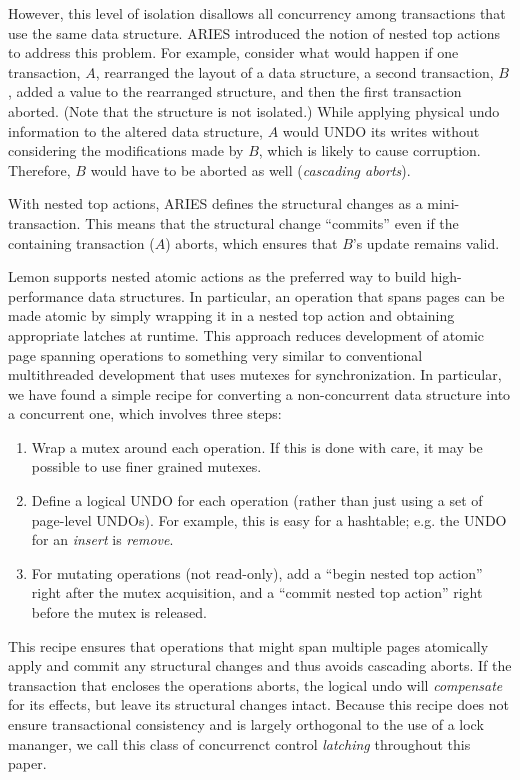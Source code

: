 \documentclass[10pt,letterpaper,twocolumn,english]{article}
\newcommand{\yad}{Lemon\xspace}
\begin{document}
However, this level of isolation disallows all concurrency among 
transactions that use the same data structure.  ARIES introduced the 
notion of nested top actions to
address this problem.  For example, consider what would happen if one
transaction, $A$, rearranged the layout of a data structure, a second
transaction, $B$, added a value to the rearranged structure, and then
the first transaction aborted.  (Note that the structure is not
isolated.)  While applying physical undo information to the altered
data structure,  $A$ would UNDO its writes
without considering the modifications made by
$B$, which is likely to cause corruption.  Therefore, $B$ would 
have to be aborted as well ({\em cascading aborts}).

With nested top actions, ARIES defines the structural changes as a
mini-transaction. This means that the structural change
``commits'' even if the containing transaction ($A$) aborts, which
ensures that $B$'s update remains valid.

\yad supports nested atomic actions as the preferred way to build
high-performance data structures. In particular, an operation that
spans pages can be made atomic by simply wrapping it in a nested top
action and obtaining appropriate latches at runtime.  This approach
reduces development of atomic page spanning operations to something
very similar to conventional multithreaded development that uses mutexes
for synchronization.
In particular, we have found a simple recipe for converting a
non-concurrent data structure into a concurrent one, which involves
three steps:
\begin{enumerate}
\item Wrap a mutex around each operation.  If this is done with care,
  it may be possible to use finer grained mutexes.
\item Define a logical UNDO for each operation (rather than just using
  a set of page-level UNDOs).  For example, this is easy for a
  hashtable; e.g. the UNDO for an {\em insert} is {\em remove}.
\item For mutating operations (not read-only), add a ``begin nested
  top action'' right after the mutex acquisition, and a ``commit
  nested top action'' right before the mutex is released.
\end{enumerate}
This recipe ensures that operations that might span multiple pages
atomically apply and commit any structural changes and thus avoids 
cascading aborts.  If the transaction that encloses the operations
aborts, the logical undo will {\em compensate} for
its effects, but leave its structural changes intact. Because this 
recipe does not ensure transactional consistency and is largely 
orthogonal to the use of a lock mananger, we call this class of 
concurrenct control {\em latching} throughout this paper.
\end{document}
